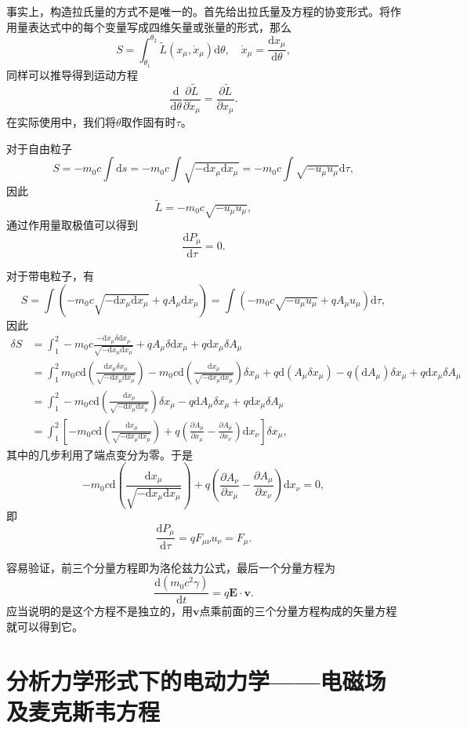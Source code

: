 \documentclass[UTF8]{ctexbook}
\renewcommand{\d}{\mathrm{d}}
\renewcommand{\b}{\boldsymbol}
\numberwithin{equation}{chapter}
\begin{document}
	事实上，构造拉氏量的方式不是唯一的。首先给出拉氏量及方程的协变形式。将作用量表达式中的每个变量写成四维矢量或张量的形式，那么
	\[S=\int_{\theta_1}^{\theta_2}\tilde{L}(x_\mu,\dot{x}_\mu)\d\theta,\quad \dot{x}_\mu=\frac{\d x_\mu}{\d \theta},\]
	同样可以推导得到运动方程
	\[\frac{\d }{\d \theta}\frac{\partial \tilde{L}}{\partial \dot{x}_\mu}=\frac{\partial \tilde{L}}{\partial x_\mu}.\]
	在实际使用中，我们将$\theta$取作固有时$\tau$。
	
	对于自由粒子
	\[S=-m_0c\int \d s = -m_0 c\int\sqrt{-\d x_\mu\d x_\mu}=-m_0c\int\sqrt{-u_\mu u_\mu}\d \tau,\]
	因此
	\[\tilde{L}=-m_0c\sqrt{-u_\mu u_\mu},\]
	通过作用量取极值可以得到
	\[\frac{\d P_\mu}{\d \tau}=0.\]
	
	对于带电粒子，有
	\[S=\int\left(-m_0 c\sqrt{-\d x_\mu \d x_\mu }+qA_\mu\d x_\mu\right)=\int \left(-m_0c\sqrt{-u_\mu u_\mu }+q A_\mu u_\mu \right)\d \tau,\]
	因此
	\begin{align*}
		\delta S&=\int_1^2 -m_0 c\frac{-\d x_\mu \delta \d x_\mu}{\sqrt{-\d x_\mu \d x_\mu}}+q A_\mu \delta \d x_\mu+q\d x_\mu \delta A_\mu \\
		&=\int_1^2 m_0c\d \left(\frac{\d x_\mu \delta x_\mu }{\sqrt{-\d x_\mu \d x_\mu}}\right)-m_0c\d \left(\frac{\d x_\mu}{\sqrt{-\d x_\mu\d x_\mu}}\right)\delta x_\mu +q\d (A_\mu\delta x_\mu)-q(\d A_\mu)\delta x_\mu + q \d x_\mu \delta A_\mu \\
		&=\int_1^2 -m_0c\d \left(\frac{\d x_\mu}{\sqrt{-\d x_\mu\d x_\mu}}\right)\delta x_\mu - q\d A_\mu\delta x_\mu +q\d x_\mu \delta A_\mu \\
		&=\int_1^2 \left[-m_0c\d \left(\frac{\d x_\mu}{\sqrt{-\d x_\mu\d x_\mu}}\right)+q\left(\frac{\partial A_\mu}{\partial x_\mu}-\frac{\partial A_\mu}{\partial x_\nu}\right)\d x_\nu\right]\delta x_\mu,
	\end{align*}
	其中的几步利用了端点变分为零。于是
	\[-m_0c\d \left(\frac{\d x_\mu}{\sqrt{-\d x_\mu\d x_\mu}}\right)+q\left(\frac{\partial A_\nu}{\partial x_\mu}-\frac{\partial A_\mu}{\partial x_\nu}\right)\d x_\nu=0,\]
	即
	\[\frac{\d P_\mu}{\d \tau}=q F_{\mu\nu} u_\nu =F_\mu.\]
	
	容易验证，前三个分量方程即为洛伦兹力公式，最后一个分量方程为
	\[\frac{\d (m_0c^2\gamma)}{\d t}=q\b{E}\cdot\b{v}.\]
	应当说明的是这个方程不是独立的，用$\b{v}$点乘前面的三个分量方程构成的矢量方程就可以得到它。
	
	\section{分析力学形式下的电动力学——电磁场及麦克斯韦方程}
	
\end{document}
